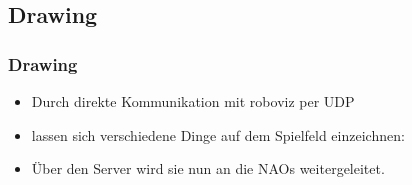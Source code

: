 
\subsection{Drawing}
 
\frame
{
  \frametitle{Drawing}
  \begin{itemize}
    \item Durch direkte Kommunikation mit roboviz per UDP
    \item lassen sich verschiedene Dinge auf dem Spielfeld einzeichnen:
    \item \"Uber den Server wird sie nun an die NAOs weitergeleitet.
  \end{itemize}
  
}
